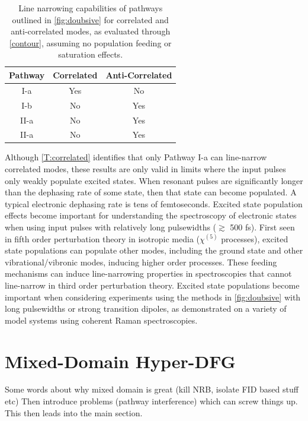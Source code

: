 \documentclass[aip, jcp, reprint, onecolumn]{revtex4-2}
\begin{document}
\begin{table}[!htbp]
	\caption{\label{T:correlated} Line narrowing capabilities of pathways outlined in \autoref{fig:doubsive} for correlated and anti-correlated modes, as evaluated through \autoref{contour}, assuming no population feeding or saturation effects.}
	\begin{ruledtabular}
		\begin{tabular}{ccc}
			Pathway & Correlated & Anti-Correlated\\
			\hline  
			I-a & Yes & No \\
			I-b & No & Yes\\
			II-a & No & Yes\\
			II-a & No & Yes\\
		\end{tabular}
	\end{ruledtabular}
\end{table}

Although \autoref{T:correlated} identifies that only Pathway I-a can line-narrow correlated modes, these results are only valid in limits where the input pulses only weakly populate excited states.
When resonant pulses are significantly longer than the dephasing rate of some state, then that state can become populated.
A typical electronic dephasing rate is tens of femtoseconds. \cite{RN131}
Excited state population effects become important for understanding the spectroscopy of electronic states when using input pulses with relatively long pulsewidths ($\gtrsim$ 500 fs). \cite{RN319, Yurs2011}
First seen in fifth order perturbation theory in isotropic media ($\chi^{(5)}$ processes), excited state populations can populate other modes, including the ground state and other vibrational/vibronic modes, inducing higher order processes.\cite{Carlson87, RN471}
These feeding mechanisms can induce line-narrowing properties in spectroscopies that cannot line-narrow in third order perturbation theory.\cite{Ouellette1982, RN319, Carlson87, RN471, RN410}
Excited state populations become important when considering experiments using the methods in \autoref{fig:doubsive} with long pulsewidths or strong transition dipoles, as demonstrated on a variety of model systems using coherent Raman spectroscopies. \cite{Ouellette1982, RN471, RN338, Yurs2011} 

\section{Mixed-Domain Hyper-DFG}
Some words about why mixed domain is great (kill NRB, isolate FID based stuff etc)
Then introduce problems (pathway interference) which can screw things up. This then leads into the main section.
\end{document}
